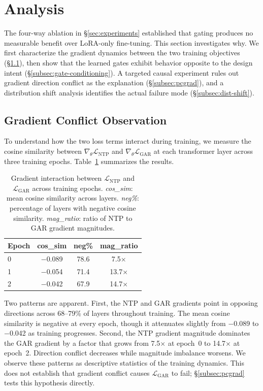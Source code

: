 \section{Analysis}\label{sec:analysis}

The four-way ablation in \S\ref{sec:experiments} established that gating produces no measurable benefit over LoRA-only fine-tuning. This section investigates why. We first characterize the gradient dynamics between the two training objectives (\S\ref{subsec:gradient-conflict}), then show that the learned gates exhibit behavior opposite to the design intent (\S\ref{subsec:gate-conditioning}). A targeted causal experiment rules out gradient direction conflict as the explanation (\S\ref{subsec:pcgrad}), and a distribution shift analysis identifies the actual failure mode (\S\ref{subsec:dist-shift}).

\subsection{Gradient Conflict Observation}\label{subsec:gradient-conflict}

To understand how the two loss terms interact during training, we measure the cosine similarity between $\nabla_\theta \mathcal{L}_\text{NTP}$ and $\nabla_\theta \mathcal{L}_\text{GAR}$ at each transformer layer across three training epochs. Table~\ref{tab:grad-conflict} summarizes the results.

\begin{table}[t]
\centering
\small
\caption{Gradient interaction between $\mathcal{L}_\text{NTP}$ and $\mathcal{L}_\text{GAR}$ across training epochs. \textit{cos\_sim}: mean cosine similarity across layers. \textit{neg\%}: percentage of layers with negative cosine similarity. \textit{mag\_ratio}: ratio of NTP to GAR gradient magnitudes.}
\label{tab:grad-conflict}
\begin{tabular}{lccc}
\toprule
\textbf{Epoch} & \textbf{cos\_sim} & \textbf{neg\%} & \textbf{mag\_ratio} \\
\midrule
0 & $-$0.089 & 78.6 & 7.5$\times$ \\
1 & $-$0.054 & 71.4 & 13.7$\times$ \\
2 & $-$0.042 & 67.9 & 14.7$\times$ \\
\bottomrule
\end{tabular}
\end{table}

Two patterns are apparent. First, the NTP and GAR gradients point in opposing directions across 68--79\% of layers throughout training. The mean cosine similarity is negative at every epoch, though it attenuates slightly from $-$0.089 to $-$0.042 as training progresses. Second, the NTP gradient magnitude dominates the GAR gradient by a factor that grows from 7.5$\times$ at epoch~0 to 14.7$\times$ at epoch~2. Direction conflict decreases while magnitude imbalance worsens. We observe these patterns as descriptive statistics of the training dynamics. This does not establish that gradient conflict causes $\mathcal{L}_\text{GAR}$ to fail; \S\ref{subsec:pcgrad} tests this hypothesis directly.


